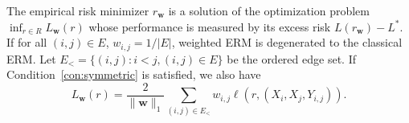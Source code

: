 \documentclass[letterpaper]{article} %
\def\LongVersion{}
\def\LongVersionEnd{}
\newcommand{\weight}{\mathbf{w}}
\newcommand{\bayeserror}{L^*}
\newcommand{\empiricalrisk}[1]{L_{#1}}
\newcommand{\lossf}{\ell}
\newcommand{\pair}[1]{(#1)}
\newcommand{\normo}[1]{\|#1\|_1}
\newcommand{\citep}[3]{(#1\ \citeauthor{#3}\ \citeyear{#3},\ #2)}
\newcommand{\citec}[2]{\citeauthor{#1}\ (#2 \citeyear{#1})}
\begin{document}
\LongVersion
The empirical risk minimizer $r_\weight{}$ is a solution of the optimization problem $\inf_{r\in R}L_\weight{}(r)$ whose performance is measured by its excess risk $L(r_\weight{})-\bayeserror{}$.
If for all $\pair{i,j}\in E$, $w_{i,j}=1/|E|$, weighted ERM is degenerated to the classical ERM.
Let $E_<=\{\pair{i,j}: i<j, \pair{i,j}\in E\}$ be the ordered edge set. If Condition~\ref{con:symmetric} is satisfied, we also have
\begin{equation}
    \label{eq:symmetric_graph_reconstruction_imcomplete_erm}
    \empiricalrisk{\weight{}}(r) = \frac{2}{\normo{\weight{}}} \sum_{\pair{i,j}\in E_<} w_{i,j} \lossf(r, (X_i,X_j, Y_{i,j})).
\end{equation}
\LongVersionEnd






\end{document}
